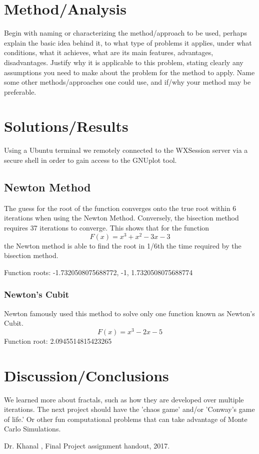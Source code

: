 \documentclass[11pt]{article}
\begin{document}
\section{Method/Analysis}\label{S:3}
Begin with naming or characterizing the method/approach to be used, perhaps explain the basic idea behind it, to what type of problems it applies, under what conditions, what it achieves, what are its main features, advantages, disadvantages. Justify why it is applicable to this problem, stating clearly any assumptions you need to make about the problem for the method to apply. Name some other methods/approaches one could use, and if/why your method may be preferable.


\section{Solutions/Results}\label{S:4}
Using a Ubuntu terminal we remotely connected to the WXSession server via a secure shell in order to gain access to the GNUplot tool.

\subsection{Newton Method}
%
The guess for the root of the function converges onto the true root within 6 iterations when using the Newton Method. Conversely, the bisection method requires 37 iterations to converge. This shows that for the function \[F(x)=x^3+x^2-3x-3\] the Newton method is able to find the root in 1/6th the time required by the bisection method.

Function roots: -1.7320508075688772, -1, 1.7320508075688774
\subsubsection{Newton's Cubit}
%
Newton famously used this method to solve only one function known as Newton's Cubit. \[F(x)=x^3-2x-5\]
Function root: 2.0945514815423265  

\section{Discussion/Conclusions}\label{S:5}
We learned more about fractals, such as how they are developed over multiple iterations. The next project should have the 'chaos game' and/or 'Conway's game of life.' Or other fun computational problems that can take advantage of Monte Carlo Simulations.

\begin{thebibliography}{100}
Dr. Khanal , Final Project assignment handout, 2017.
%
%

\end{thebibliography}
\end{document}
